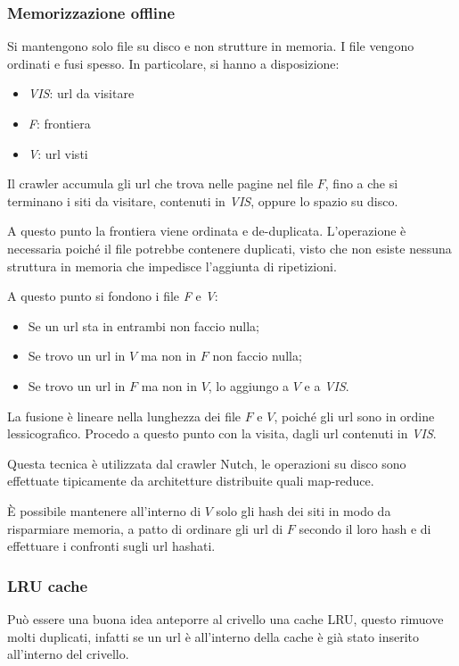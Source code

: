 \subsubsection{Memorizzazione offline} 
Si mantengono solo file su disco e non strutture in memoria. 
I file vengono ordinati e fusi spesso. In particolare, si hanno a disposizione: 
\begin{itemize}
    \item \emph{VIS}: url da visitare
    \item \emph{F}: frontiera
    \item \emph{V}: url visti
\end{itemize}
Il crawler accumula gli url che trova nelle pagine nel file $F$, 
fino a che si terminano i siti da visitare, contenuti 
in \emph{VIS}, oppure lo spazio su disco.

A questo punto la frontiera viene ordinata e de-duplicata. 
L'operazione è necessaria poiché il file potrebbe contenere duplicati, 
visto che non esiste nessuna struttura 
in memoria che impedisce l'aggiunta di ripetizioni.

A questo punto si fondono i file \emph{F} e \emph{V}: 
\begin{itemize}
    \item Se un url sta in entrambi non faccio nulla;
    \item Se trovo un url in $V$ ma non in $F$ non faccio nulla;
    \item Se trovo un url in $F$ ma non in $V$, lo aggiungo a $V$ e 
    a \emph{VIS}.
\end{itemize}
La fusione è lineare nella lunghezza dei file $F$ e $V$, poiché gli url sono in ordine lessicografico.
Procedo a questo punto con la visita, dagli url contenuti in \emph{VIS}.
\begin{remark}
    Questa tecnica è utilizzata dal crawler Nutch, le operazioni su disco 
    sono effettuate tipicamente da architetture distribuite quali map-reduce.
\end{remark}
\begin{remark}
    È possibile mantenere all'interno di $V$ solo gli hash dei siti 
    in modo da risparmiare memoria, a patto di ordinare gli url di $F$ secondo il 
    loro hash e di effettuare i confronti sugli url hashati.
\end{remark}

\subsubsection{LRU cache}
Può essere una buona idea anteporre al crivello una cache LRU, questo rimuove 
molti duplicati, infatti se un url è all'interno della cache è già stato inserito 
all'interno del crivello. 

